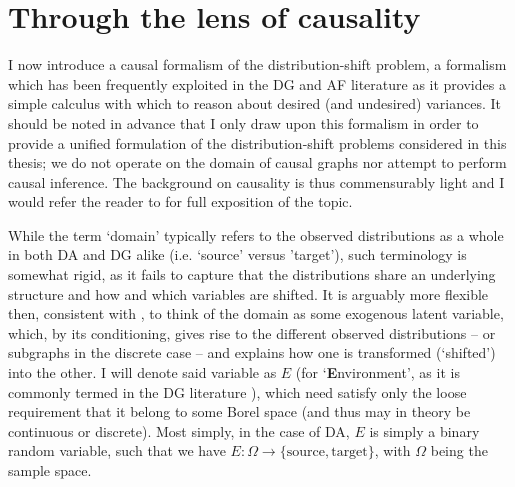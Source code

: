 \section{Through the lens of causality}\label{sec:lens-of-causality}
I now introduce a causal formalism of the distribution-shift problem, a formalism which has been
frequently exploited in the \ac{DG} and \ac{AF} literature as it provides a simple calculus with
which to reason about desired (and undesired) variances.
%
It should be noted in advance that I only draw upon this formalism in order to provide a unified
formulation of the distribution-shift problems considered in this thesis; we do not operate on the
domain of causal graphs nor attempt to perform causal inference. 
%
The background on causality is thus commensurably light and I would refer the reader to
\citet{pearl2009causality} for full exposition of the topic.

While the term `domain' typically refers to the observed distributions as a whole in both \ac{DA}
and \ac{DG} alike (i.e. `source' versus 'target'), such terminology is somewhat rigid, as it fails
to capture that the distributions share an underlying structure and how and which variables are
shifted.
%
%
It is arguably more flexible then, consistent with \citep{mooij2020joint}, to think of the domain
as some exogenous latent variable, which, by its conditioning, gives rise to the different observed
distributions -- or subgraphs in the discrete case -- and explains how one is transformed
(`shifted') into the other.
%
I will denote said variable as \(E\) (for `\textbf{E}nvironment', as it is commonly termed in the
\ac{DG} literature \citep{arjovsky2019invariant}), which need satisfy only the loose requirement that it
belong to some Borel space (and thus may in theory be continuous or discrete).
%
Most simply, in the case of \ac{DA}, \(E\) is simply a binary random variable, such that we have \(E:
\Omega \to \{ \text{source}, \text{target} \}\), with \( \Omega \) being the sample space.
%

